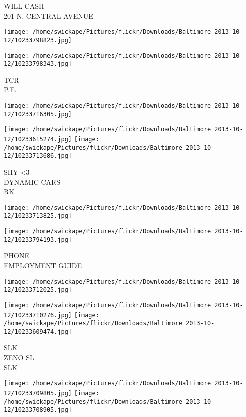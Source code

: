 \documentclass[10pt,letterpaper]{article}
\begin{document}
WILL CASH\\
201 N. CENTRAL AVENUE
\pagebreak

\texttt{[image: /home/swickape/Pictures/flickr/Downloads/Baltimore 2013-10-12/10233798823.jpg]}

\vspace{0.25in}
\texttt{[image: /home/swickape/Pictures/flickr/Downloads/Baltimore 2013-10-12/10233798343.jpg]}

TCR\\
P.E.
\pagebreak

\texttt{[image: /home/swickape/Pictures/flickr/Downloads/Baltimore 2013-10-12/10233716305.jpg]}

\vspace{0.25in}
\texttt{[image: /home/swickape/Pictures/flickr/Downloads/Baltimore 2013-10-12/10233615274.jpg]}
\texttt{[image: /home/swickape/Pictures/flickr/Downloads/Baltimore 2013-10-12/10233713686.jpg]}

SHY <3\\
DYNAMIC CARS\\
RK
\pagebreak

\texttt{[image: /home/swickape/Pictures/flickr/Downloads/Baltimore 2013-10-12/10233713825.jpg]}

\vspace{0.25in}
\texttt{[image: /home/swickape/Pictures/flickr/Downloads/Baltimore 2013-10-12/10233794193.jpg]}

PHONE\\
EMPLOYMENT GUIDE
\pagebreak

\texttt{[image: /home/swickape/Pictures/flickr/Downloads/Baltimore 2013-10-12/10233712025.jpg]}

\vspace{0.25in}
\texttt{[image: /home/swickape/Pictures/flickr/Downloads/Baltimore 2013-10-12/10233710276.jpg]}
\texttt{[image: /home/swickape/Pictures/flickr/Downloads/Baltimore 2013-10-12/10233609474.jpg]}

SLK\\
ZENO SL\\
SLK
\pagebreak

\texttt{[image: /home/swickape/Pictures/flickr/Downloads/Baltimore 2013-10-12/10233709805.jpg]}
\texttt{[image: /home/swickape/Pictures/flickr/Downloads/Baltimore 2013-10-12/10233708905.jpg]}
\end{document}
